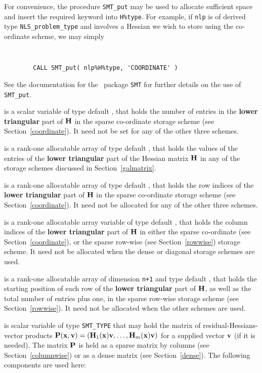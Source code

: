 \documentclass{galahad}
\newcommand{\packagename}{NLS}
\begin{document}
\begin{description}
\begin{description}
For convenience, the procedure {\tt SMT\_put}
may be used to allocate sufficient space and insert the required keyword
into {\tt H\%type}.
For example, if {\tt nlp} is of derived type {\tt \packagename\_problem\_type}
and involves a Hessian we wish to store using the co-ordinate scheme,
we may simply
{\tt
\begin{verbatim}
        CALL SMT_put( nlp%H%type, 'COORDINATE' )
\end{verbatim}
}
\noindent
See the documentation for the \galahad\ package {\tt SMT}
for further details on the use of {\tt SMT\_put}.

 is a scalar variable of type default \integer, that
holds the number of entries in the {\bf lower triangular} part of ${\mathbf{H}}$
in the sparse co-ordinate storage scheme (see Section~\ref{coordinate}).
It need not be set for any of the other three schemes.

 is a rank-one allocatable array of type default \realdp, that holds
the values of the entries of the {\bf lower triangular} part
of the Hessian matrix ${\mathbf{H}}$ in any of the
storage schemes discussed in Section~\ref{galmatrix}.

 is a rank-one allocatable array of type default \integer,
that holds the row indices of the {\bf lower triangular} part of ${\mathbf{H}}$
in the sparse co-ordinate storage
scheme (see Section~\ref{coordinate}).
It need not be allocated for any of the other three schemes.

 is a rank-one allocatable array variable of type default \integer,
that holds the column indices of the {\bf lower triangular} part of
${\mathbf{H}}$ in either the sparse co-ordinate
(see Section~\ref{coordinate}), or the sparse row-wise
(see Section~\ref{rowwise}) storage scheme.
It need not be allocated when the dense or diagonal storage schemes are used.

 is a rank-one allocatable array of dimension {\tt n+1} and type
default \integer, that holds the starting position of
each row of the {\bf lower triangular} part of ${\mathbf{H}}$, as well
as the total number of entries plus one, in the sparse row-wise storage
scheme (see Section~\ref{rowwise}). It need not be allocated when the
other schemes are used.

\end{description}

 is scalar variable of type {\tt SMT\_TYPE}
that may hold the matrix of residual-Hessians-vector products
${\mathbf{P}}({\mathbf{x}},{\mathbf{v}}) = ({\mathbf{H}}_1({\mathbf{x}}) {\mathbf{v}}, \ldots, {\mathbf{H}}_m({\mathbf{x}}) {\mathbf{v}})$
for a supplied vector ${\mathbf{v}}$ (if it is needed).
The matrix ${\mathbf{P}}$ is held as a
sparse matrix by columns (see Section~\ref{columnwise}) or as a
dense matrix (see Section~\ref{dense}).
The following components are used here:


\end{description}
\end{document}
